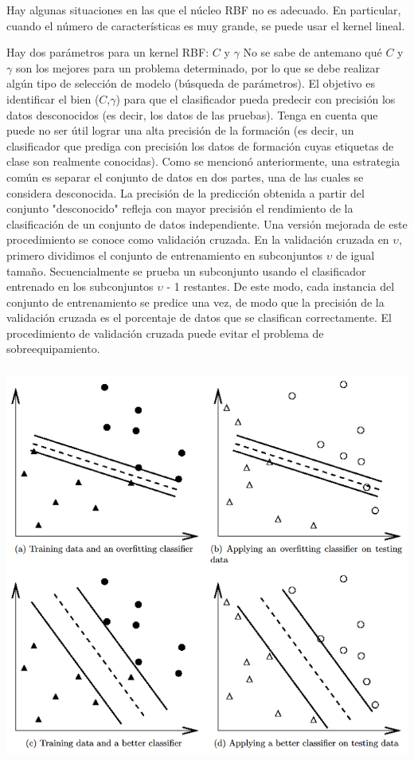 Hay algunas situaciones en las que el núcleo RBF no es adecuado.  En particular, cuando el número de características es muy grande, se puede usar el kernel lineal.

Hay dos parámetros para un kernel RBF: $C$ y $\gamma$  No se sabe de antemano qué $C$ y $\gamma$ son los mejores para un problema determinado, por lo que se debe realizar algún tipo de selección de modelo (búsqueda de parámetros).   El objetivo es identificar el bien ($C$,$\gamma$) para que el clasificador pueda predecir con precisión los datos desconocidos (es decir, los datos de las pruebas).  Tenga en cuenta que puede no ser útil lograr una alta precisión de la formación (es decir, un clasificador que prediga con precisión los datos de formación cuyas etiquetas de clase son realmente conocidas).  Como se mencionó anteriormente, una estrategia común es separar el conjunto de datos en dos partes, una de las cuales se considera desconocida.  La precisión de la predicción obtenida a partir del conjunto "desconocido" refleja con mayor precisión el rendimiento de la clasificación de un conjunto de datos independiente.  Una versión mejorada de este procedimiento se conoce como validación cruzada. En la validación cruzada en $\upsilon$, primero dividimos el conjunto de entrenamiento en subconjuntos $\upsilon$ de igual tamaño.  Secuencialmente se prueba un subconjunto usando el clasificador entrenado en los subconjuntos $\upsilon$ - 1 restantes.  De este modo, cada instancia del conjunto de entrenamiento se predice una vez, de modo que la precisión de la validación cruzada es el porcentaje de datos que se clasifican correctamente. El procedimiento de validación cruzada puede evitar el problema de sobreequipamiento. 

\begin{center}
\includegraphics[height=5.15in]{figuras/Capture2.PNG}
\end{center}

